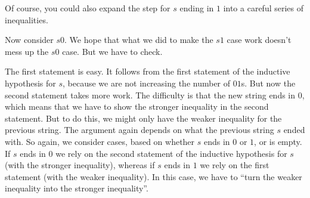 \begin{definition}
\begin{editingnotes}
Of course, you could also expand the step for $s$ ending in $1$ into a
careful series of inequalities.

Now consider $s0$.  We hope that what we did to make the $s1$ case
work doesn't mess up the $s0$ case.  But we have to check.

The first statement is easy.  It follows from the first statement of
the inductive hypothesis for $s$, because we are not increasing the
number of $01$s.  But now the second statement takes more work.  The
difficulty is that the new string ends in $0$, which means that we
have to show the stronger inequality in the second statement.  But to
do this, we might only have the weaker inequality for the previous
string.  The argument again depends on what the previous string $s$
ended with.  So again, we consider cases, based on whether $s$ ends in
$0$ or $1$, or is empty.  If $s$ ends in $0$ we rely on the second
statement of the inductive hypothesis for $s$ (with the stronger
inequality), whereas if $s$ ends in $1$ we rely on the first statement
(with the weaker inequality).  In this case, we have to ``turn the
weaker inequality into the stronger inequality''.

\iffalse
{}
\end{editingnotes}
\end{definition}
